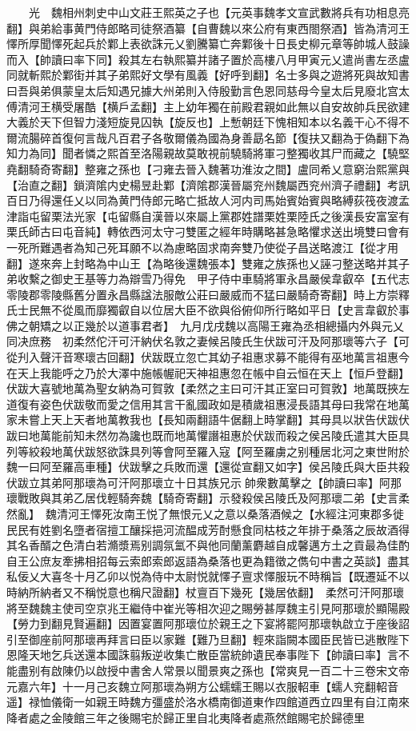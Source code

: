 　　光　魏相州刺史中山文莊王熙英之子也【元英事魏孝文宣武數將兵有功相息亮翻】與弟給事黄門侍郎略司徒祭酒纂【自曹魏以來公府有東西閤祭酒】皆為清河王懌所厚聞懌死起兵於鄴上表欲誅元乂劉騰纂亡奔鄴後十日長史柳元章等帥城人鼓譟而入【帥讀曰率下同】殺其左右執熙纂并諸子置於高樓八月甲寅元乂遣尚書左丞盧同就斬熙於鄴街并其子弟熙好文學有風義【好呼到翻】名士多與之遊將死與故知書曰吾與弟俱蒙皇太后知遇兄據大州弟則入侍殷勤言色恩同慈母今皇太后見廢北宫太傅清河王横受屠酷【横戶孟翻】主上幼年獨在前殿君親如此無以自安故帥兵民欲建大義於天下但智力淺短旋見囚執【旋反也】上慙朝廷下愧相知本以名義干心不得不爾流腸碎首復何言哉凡百君子各敬爾儀為國為身善勗名節【復扶又翻為于偽翻下為知力為同】聞者憐之熙首至洛陽親故莫敢視前驍騎將軍刁整獨收其尸而藏之【驍堅堯翻騎奇寄翻】整雍之孫也【刁雍去晉入魏著功淮汝之間】盧同希乂意窮治熙黨與【治直之翻】鎖濟隂内史楊昱赴鄴【濟隂郡漢晉屬兖州魏屬西兖州濟子禮翻】考訊百日乃得還任乂以同為黄門侍郎元略亡抵故人河内司馬始賓始賓與略縛荻筏夜渡孟津詣屯留栗法光家【屯留縣自漢晉以來屬上黨郡姓譜栗姓栗陸氏之後漢長安富室有栗氏師古曰屯音純】轉依西河太守刁雙匿之經年時購略甚急略懼求送出境雙曰會有一死所難遇者為知己死耳願不以為慮略固求南奔雙乃使從子昌送略渡江【從才用翻】遂來奔上封略為中山王【為略後還魏張本】雙雍之族孫也乂誣刁整送略并其子弟收繫之御史王基等力為辯雪乃得免　甲子侍中車騎將軍永昌嚴侯韋叡卒【五代志零陵郡零陵縣舊分置永昌縣諡法服敵公莊曰嚴威而不猛曰嚴騎奇寄翻】時上方崇釋氏士民無不從風而靡獨叡自以位居大臣不欲與俗俯仰所行略如平日【史言韋叡於事佛之朝矯之以正幾於以道事君者】　九月戊戌魏以高陽王雍為丞相總攝内外與元乂同决庶務　初柔然佗汗可汗納伏名敦之妻候呂陵氏生伏跋可汗及阿那瓌等六子【可從刋入聲汗音寒瓌古回翻】伏跋既立忽亡其幼子祖惠求募不能得有巫地萬言祖惠今在天上我能呼之乃於大澤中施帳幄祀天神祖惠忽在帳中自云恒在天上【恒戶登翻】伏跋大喜號地萬為聖女納為可賀敦【柔然之主曰可汗其正室曰可賀敦】地萬既挾左道復有姿色伏跋敬而愛之信用其言干亂國政如是積歲祖惠浸長語其母曰我常在地萬家未嘗上天上天者地萬教我也【長知兩翻語牛倨翻上時掌翻】其母具以狀告伏跋伏跋曰地萬能前知未然勿為讒也既而地萬懼譖祖惠於伏跋而殺之侯呂陵氏遣其大臣具列等絞殺地萬伏跋怒欲誅具列等會阿至羅入寇【阿至羅虜之别種居北河之東世附於魏一曰阿至羅高車種】伏跋擊之兵敗而還【還從宣翻又如字】侯呂陵氏與大臣共殺伏跋立其弟阿那瓌為可汗阿那瓌立十日其族兄示帥衆數萬擊之【帥讀曰率】阿那瓌戰敗與其弟乙居伐輕騎奔魏【騎奇寄翻】示發殺侯呂陵氏及阿那瓌二弟【史言柔然亂】　魏清河王懌死汝南王悦了無恨元乂之意以桑落酒候之【水經注河東郡多徙民民有姓劉名墮者宿擅工釀採挹河流醖成芳酎懸食同枯枝之年排于桑落之辰故酒得其名香醑之色清白若滫漿焉别調氛氳不與他同蘭薰麝越自成馨邁方土之貢最為佳酌自王公庶友牽拂相招每云索郎索郎返語為桑落也更為籍徵之儁句中書之英談】盡其私佞乂大喜冬十月乙卯以悦為侍中太尉悦就懌子亶求懌服玩不時稱旨【既遷延不以時納所納者又不稱悦意也稱尺證翻】杖亶百下幾死【幾居依翻】　柔然可汗阿那瓌將至魏魏主使司空京兆王繼侍中崔光等相次迎之賜勞甚厚魏主引見阿那瓌於顯陽殿【勞力到翻見賢遍翻】因置宴置阿那瓌位於親王之下宴將罷阿那瓌執啟立于座後詔引至御座前阿那瓌再拜言曰臣以家難【難乃旦翻】輕來詣闕本國臣民皆已逃散陛下恩隆天地乞兵送還本國誅翦叛逆收集亡散臣當統帥遺民奉事陛下【帥讀曰率】言不能盡别有啟陳仍以啟授中書舍人常景以聞景爽之孫也【常爽見一百二十三卷宋文帝元嘉六年】十一月己亥魏立阿那瓌為朔方公蠕蠕王賜以衣服軺車【蠕人兖翻軺音遥】禄恤儀衛一如親王時魏方彊盛於洛水橋南御道東作四館道西立四里有自江南來降者處之金陵館三年之後賜宅於歸正里自北夷降者處燕然館賜宅於歸德里
